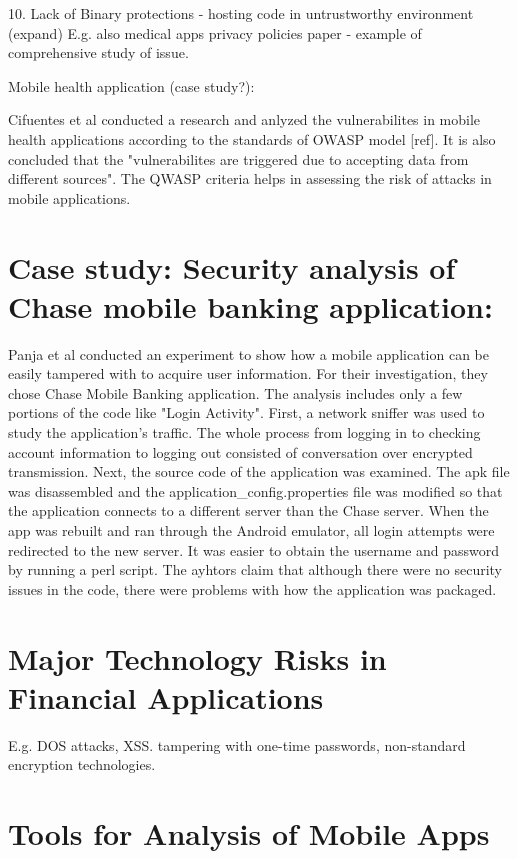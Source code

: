 \documentclass{mproj}
\begin{document}
10. Lack of Binary protections - hosting code in untrustworthy environment (expand)
E.g. also medical apps privacy policies paper - example of comprehensive study of issue.

Mobile health application (case study?):

Cifuentes et al conducted a research and anlyzed the vulnerabilites in mobile health applications according to the standards of OWASP model [ref].  It is also concluded that the "vulnerabilites are triggered due to accepting data from different sources". The QWASP criteria helps in assessing the risk of attacks in mobile applications.

\section{Case study: Security analysis of Chase mobile banking application:}

Panja et al conducted an experiment to show how a mobile application can be easily tampered with to acquire user information. For their investigation, they chose Chase Mobile Banking application. The analysis includes only a few portions of the code like "Login Activity". First, a network sniffer was used to study the application's traffic. The whole process from logging in to checking account information  to logging out consisted of conversation over encrypted transmission. Next, the source code of the application was examined. The apk file was disassembled and the application\_config.properties file was modified so that the application connects to a different server than the Chase server. When the app was rebuilt and ran through the Android emulator, all login attempts were redirected to the new server. It was easier to obtain the username and password by running a perl script. The ayhtors claim that although there were no security issues in the code, there were problems with how the application was packaged.

\section{Major Technology Risks in Financial Applications}

E.g. DOS attacks, XSS. tampering with one-time passwords, non-standard encryption technologies.


\section{Tools for Analysis of Mobile Apps}
\end{document}
